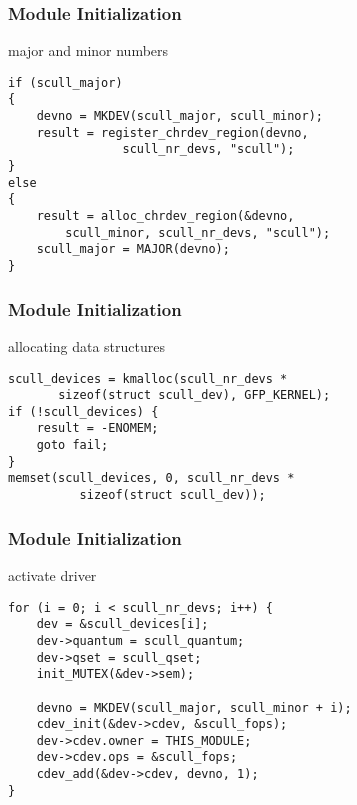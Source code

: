 \documentclass[dvipsnames]{beamer}
\begin{document}
\begin{frame}[fragile]
  \frametitle{Module Initialization}

  \begin{exampleblock}{major and minor numbers}
    \begin{lstlisting}
if (scull_major)
{
    devno = MKDEV(scull_major, scull_minor);
    result = register_chrdev_region(devno,
                scull_nr_devs, "scull");
}
else
{
    result = alloc_chrdev_region(&devno,
        scull_minor, scull_nr_devs, "scull");
    scull_major = MAJOR(devno);
}
    \end{lstlisting}
  \end{exampleblock}
\end{frame}

\begin{frame}[fragile]
  \frametitle{Module Initialization}

  \begin{exampleblock}{allocating data structures}
    \begin{lstlisting}
scull_devices = kmalloc(scull_nr_devs *
       sizeof(struct scull_dev), GFP_KERNEL);
if (!scull_devices) {
    result = -ENOMEM;
    goto fail;
}
memset(scull_devices, 0, scull_nr_devs *
          sizeof(struct scull_dev));
    \end{lstlisting}
  \end{exampleblock}
\end{frame}

\begin{frame}[fragile]
  \frametitle{Module Initialization}

  \begin{exampleblock}{activate driver}
    \begin{lstlisting}
for (i = 0; i < scull_nr_devs; i++) {
    dev = &scull_devices[i];
    dev->quantum = scull_quantum;
    dev->qset = scull_qset;
    init_MUTEX(&dev->sem);

    devno = MKDEV(scull_major, scull_minor + i);
    cdev_init(&dev->cdev, &scull_fops);
    dev->cdev.owner = THIS_MODULE;
    dev->cdev.ops = &scull_fops;
    cdev_add(&dev->cdev, devno, 1);
}
    \end{lstlisting}
  \end{exampleblock}
\end{frame}
\end{document}
